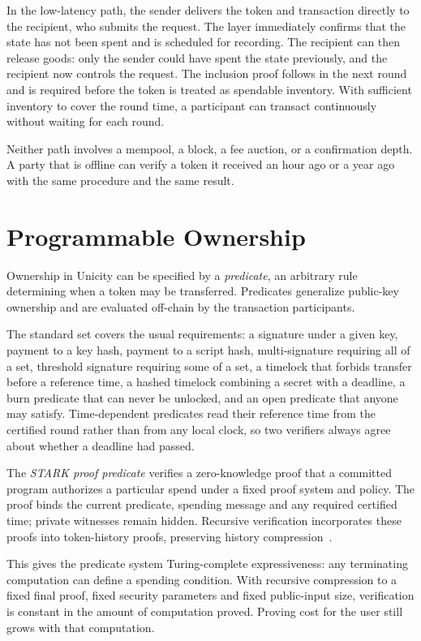 In the low-latency path, the sender delivers the token and transaction directly to the recipient, who submits the request. The layer immediately confirms that the state has not been spent and is scheduled for recording. The recipient can then release goods: only the sender could have spent the state previously, and the recipient now controls the request. The inclusion proof follows in the next round and is required before the token is treated as spendable inventory. With sufficient inventory to cover the round time, a participant can transact continuously without waiting for each round.

Neither path involves a mempool, a block, a fee auction, or a confirmation depth. A party that is offline can verify a token it received an hour ago or a year ago with the same procedure and the same result.

\section{Programmable Ownership}

Ownership in Unicity can be specified by a \emph{predicate}, an arbitrary rule determining when a token may be transferred. Predicates generalize public-key ownership and are evaluated off-chain by the transaction participants.

The standard set covers the usual requirements: a signature under a given key, payment to a key hash, payment to a script hash, multi-signature requiring all of a set, threshold signature requiring some of a set, a timelock that forbids transfer before a reference time, a hashed timelock combining a secret with a deadline, a burn predicate that can never be unlocked, and an open predicate that anyone may satisfy. Time-dependent predicates read their reference time from the certified round rather than from any local clock, so two verifiers always agree about whether a deadline had passed.

The \emph{STARK proof predicate} verifies a zero-knowledge proof that a committed program authorizes a particular spend under a fixed proof system and policy. The proof binds the current predicate, spending message and any required certified time; private witnesses remain hidden. Recursive verification incorporates these proofs into token-history proofs, preserving history compression~\cite{yellowpaper}.

This gives the predicate system Turing-complete expressiveness: any terminating computation can define a spending condition. With recursive compression to a fixed final proof, fixed security parameters and fixed public-input size, verification is constant in the amount of computation proved. Proving cost for the user still grows with that computation.

